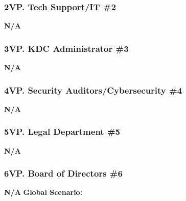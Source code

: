 \documentclass[]{article}
\begin{document}
\subsubsection*{2VP. Tech Support/IT \#2}
\textbf{N/A}
\subsubsection*{3VP. KDC Administrator \#3}
\textbf{N/A}
\subsubsection*{4VP. Security Auditors/Cybersecurity \#4}
\textbf{N/A}
\subsubsection*{5VP. Legal Department \#5}
\textbf{N/A}
\subsubsection*{6VP. Board of Directors \#6}
\textbf{N/A}\newline\newline
\textbf{Global Scenario:}
\end{document}
